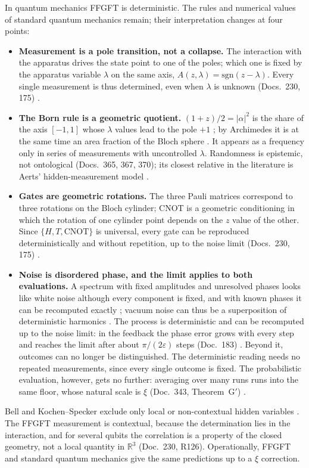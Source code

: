 In quantum mechanics FFGFT is deterministic. The rules and numerical values of standard quantum
mechanics remain; their interpretation changes at four points:
\begin{itemize}[leftmargin=*,itemsep=2pt]
\item \textbf{Measurement is a pole transition, not a collapse.} The interaction with the
  apparatus drives the state point to one of the poles; which one is fixed by the apparatus
  variable $\lambda$ on the same axis, $A(z,\lambda)=\mathrm{sgn}(z-\lambda)$. Every single
  measurement is thus determined, even when $\lambda$ is unknown (Docs.~230, 175) \KM.
\item \textbf{The Born rule is a geometric quotient.} $(1+z)/2=|\alpha|^2$ is the share of the
  axis $[-1,1]$ whose $\lambda$ values lead to the pole $+1$ \KM; by Archimedes it is at the same time
  an area fraction of the Bloch sphere \BM. It appears as a frequency only in series of
  measurements with uncontrolled $\lambda$. Randomness is epistemic, not ontological
  (Docs.~365, 367, 370); its closest relative in the literature is Aerts' hidden-measurement
  model \QM.
\item \textbf{Gates are geometric rotations.} The three Pauli matrices correspond to three
  rotations on the Bloch cylinder; CNOT is a geometric conditioning in which the rotation of one
  cylinder point depends on the $z$ value of the other. Since $\{H,T,\mathrm{CNOT}\}$ is
  universal, every gate can be reproduced deterministically and without repetition, up to the
  noise limit (Docs.~230, 175) \KM.
\item \textbf{Noise is disordered phase, and the limit applies to both evaluations.} A
  spectrum with fixed amplitudes and unresolved phases looks like white noise although every
  component is fixed, and with known phases it can be recomputed exactly \KM; vacuum noise can thus be a superposition of deterministic harmonics \SM.
  The process is deterministic and can be recomputed up to the noise limit: in the feedback the
  phase error grows with every step and reaches the limit after about $\pi/(2\varepsilon)$ steps
  (Doc.~183) \SM. Beyond it, outcomes can no longer be distinguished. The deterministic reading needs
  no repeated measurements, since every single outcome is fixed. The probabilistic evaluation,
  however, gets no further: averaging over many runs runs into the same floor, whose natural
  scale is $\xi$ (Doc.~343, Theorem~G$'$) \SM.
\end{itemize}
Bell and Kochen--Specker exclude only local or non-contextual hidden variables \QM. The FFGFT
measurement is contextual, because the determination lies in the interaction, and for several
qubits the correlation is a property of the closed geometry, not a local quantity in
$\mathbb{R}^3$ (Doc.~230, R126). Operationally, FFGFT and standard quantum mechanics give the same
predictions up to a $\xi$ correction.

